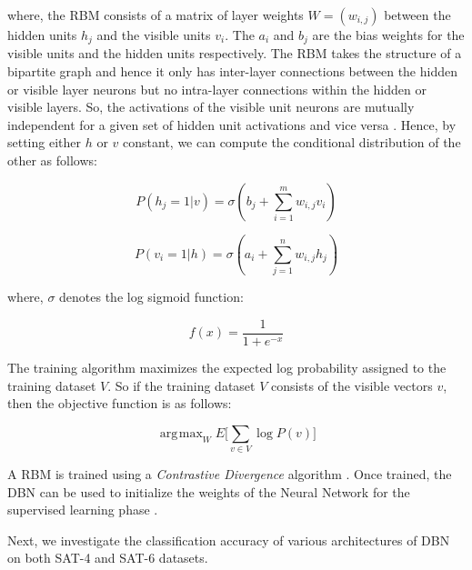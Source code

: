 \documentclass[11pt,a4paper]{article}
\DeclareMathOperator*{\argmax}{\arg\!\max}
\begin{document}
where, the RBM consists of a matrix of layer weights $W=(w_{i,j})$ between the hidden units $h_j$ and the visible units $v_i$. The $a_i$ and $b_j$ are the bias weights for the visible units and the hidden units respectively.
The RBM takes the structure of a bipartite graph and hence it only has inter-layer connections between the hidden or visible layer neurons but no intra-layer connections within the hidden or visible layers. So, the activations of the visible unit neurons are mutually independent for a given set of hidden unit activations and vice versa \cite{carreiraperpinan2005contrastive}.  Hence, by setting either $h$ or $v$ constant, we can compute the conditional distribution of the other as follows:

\begin{equation}
P(h_j=1|v) = \sigma(b_j + \sum_{i=1}^{m} w_{i,j} v_{i})
\end{equation}

\begin{equation}
P(v_i=1|h) = \sigma(a_i + \sum_{j=1}^{n} w_{i,j} h_{j})
\end{equation}

where, $\sigma$ denotes the log sigmoid function:

\begin{equation}
f(x) = \frac{1}{1+e^{-x}}
\end{equation}

The training algorithm maximizes the expected log probability assigned to the training dataset $V$. So if the training dataset $V$ consists of the visible vectors $v$, then the objective function is as follows:

\begin{equation}
\argmax_{W} E\Big[\sum_{v \in V} \log{P(v)} \Big]
\end{equation}

A RBM is trained using a \emph{Contrastive Divergence} algorithm \cite{carreiraperpinan2005contrastive}. Once trained, the DBN can be used to initialize the weights of the Neural Network for the supervised learning phase \cite{Bengio2009}. 

Next, we investigate the classification accuracy of various architectures of DBN on both SAT-4 and SAT-6 datasets. 
\end{document}
